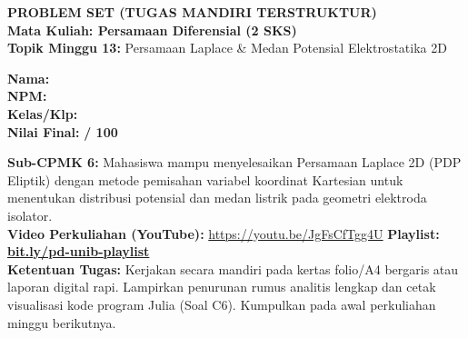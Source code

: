 \documentclass[10pt,a4paper]{article}
\begin{document}
\noindent\begin{minipage}[c]{0.68\textwidth}%
  {\large\textbf{\color{unibblue}PROBLEM SET (TUGAS MANDIRI TERSTRUKTUR)}}\\[1mm]
  {\normalsize\textbf{Mata Kuliah: Persamaan Diferensial (2 SKS)}}\\[0.5mm]
  {\small\textbf{Topik Minggu 13:} Persamaan Laplace \& Medan Potensial Elektrostatika 2D}%
\end{minipage}%
\hfill%
\begin{minipage}[c]{0.30\textwidth}%
  \begin{tcolorbox}[colback=unibblue!5,colframe=unibblue,boxrule=0.6pt,arc=2pt,left=4pt,right=4pt,top=2pt,bottom=2pt]
    \scriptsize
    \textbf{Nama:} \dotfill\\[1.2mm]
    \textbf{NPM:} \dotfill\\[1.2mm]
    \textbf{Kelas/Klp:} \dotfill\\[1.2mm]
    \textbf{Nilai Final:} \hfill \textbf{/ 100}
  \end{tcolorbox}%
\end{minipage}\par

\vspace{1.5mm}

\begin{tcolorbox}[colback=boxbg,colframe=unibgold!90!black,boxrule=0.6pt,arc=2pt,left=5pt,right=5pt,top=3pt,bottom=3pt,title=\textbf{\scriptsize Capaian Pembelajaran (Sub-CPMK 6) \& Pedoman Pengerjaan Tugas}]
  \scriptsize
  \textbf{Sub-CPMK 6:} Mahasiswa mampu menyelesaikan Persamaan Laplace 2D (PDP Eliptik) dengan metode pemisahan variabel koordinat Kartesian untuk menentukan distribusi potensial dan medan listrik pada geometri elektroda isolator.\\
  \textbf{Video Perkuliahan (YouTube):} \url{https://youtu.be/JgFsCfTgg4U} \hfill \textbf{Playlist:} \href{https://www.youtube.com/playlist?list=PLS5oOZWXZeTw}{\color{unibblue}\textbf{bit.ly/pd-unib-playlist}}\\\textbf{Ketentuan Tugas:} Kerjakan secara mandiri pada kertas folio/A4 bergaris atau laporan digital rapi. Lampirkan penurunan rumus analitis lengkap dan cetak visualisasi kode program Julia (Soal C6). Kumpulkan pada awal perkuliahan minggu berikutnya.
\end{tcolorbox}

\vspace{1.5mm}
\end{document}

